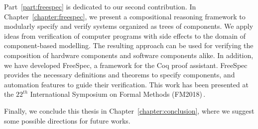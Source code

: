 Part~\ref{part:freespec} is dedicated to our second contribution.
%
In Chapter~\ref{chapter:freespec}, we present a compositional reasoning
framework to modularly specify and verify systems organized as trees of
components.
%
We apply ideas from verification of computer programs with side effects to the
domain of component-based modelling. The resulting approach can be used for
verifying the composition of hardware components and software components alike.
%
In addition, we have developed FreeSpec, a framework for the Coq proof
assistant.
%
FreeSpec provides the necessary definitions and theorems to specify components,
and automation features to guide their verification.
%
This work has been presented at the $22^{th}$ International Symposium on Formal
Methods (FM2018)\,\cite{letan2018freespec}.

Finally, we conclude this thesis in Chapter~\ref{chapter:conclusion}, where we
suggest some possible directions for future works.
